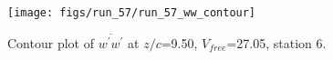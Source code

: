 \begin{figure}[H]
\centering
\texttt{[image: figs/run\_57/run\_57\_ww\_contour]}
\caption{Contour plot of $\overline{w^\prime w^\prime}$ at $z/c$=9.50, $V_{free}$=27.05, station 6.}
\label{fig:run_57_ww_contour}
\end{figure}


